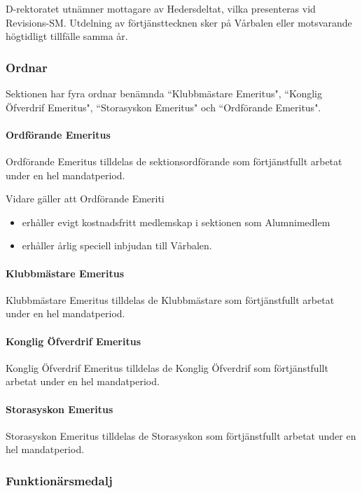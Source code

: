 \documentclass[a4paper,12pt]{article}
\begin{document}
D-rektoratet utnämner mottagare av Hedersdeltat, vilka presenteras vid Revisions-SM. Utdelning av förtjänsttecknen sker på Vårbalen eller motsvarande högtidligt tillfälle samma år.

\subsubsection{Ordnar}

Sektionen har fyra ordnar benämnda ``Klubbmästare Emeritus", ``Konglig Öfverdrif Emeritus", ``Storasyskon Emeritus" och ``Ordförande Emeritus".

\paragraph{Ordförande Emeritus}

Ordförande Emeritus tilldelas de sektionsordförande som förtjänstfullt arbetat under en hel mandatperiod.

Vidare gäller att Ordförande Emeriti

\begin{itemize}
  \item erhåller evigt kostnadsfritt medlemskap i sektionen som Alumnimedlem
  \item erhåller årlig speciell inbjudan till Vårbalen.
\end{itemize}

\paragraph{Klubbmästare Emeritus}

Klubbmästare Emeritus tilldelas de Klubbmästare som förtjänstfullt arbetat under en hel mandatperiod.

\paragraph{Konglig Öfverdrif Emeritus}

Konglig Öfverdrif Emeritus tilldelas de Konglig Öfverdrif som förtjänstfullt arbetat under en hel mandatperiod.

\paragraph{Storasyskon Emeritus}

Storasyskon Emeritus tilldelas de Storasyskon som förtjänstfullt arbetat under en hel mandatperiod.

\subsubsection{Funktionärsmedalj}
\end{document}
